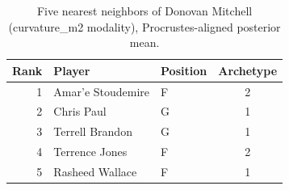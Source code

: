 \begin{table}[htbp]
  \centering\small
  \begin{tabular}{rllc}
    \toprule
    Rank & Player & Position & Archetype \\
    \midrule
    1 & Amar'e Stoudemire & F & 2 \\
    2 & Chris Paul & G & 1 \\
    3 & Terrell Brandon & G & 1 \\
    4 & Terrence Jones & F & 2 \\
    5 & Rasheed Wallace & F & 1 \\
    \bottomrule
  \end{tabular}
  \caption{Five nearest neighbors of Donovan Mitchell (curvature_m2 modality), Procrustes-aligned posterior mean.}
  \label{tab:Donovan_Mitchell_neighbors_curvature_m2}
\end{table}

